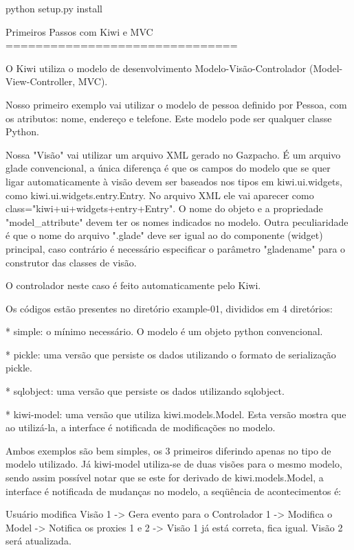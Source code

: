    python setup.py install



Primeiros Passos com Kiwi e MVC
===============================

O Kiwi utiliza o modelo de desenvolvimento
Modelo-Visão-Controlador (Model-View-Controller, MVC).

Nosso primeiro exemplo vai utilizar o modelo de pessoa definido por
Pessoa, com os atributos: nome, endereço e telefone. Este modelo pode
ser qualquer classe Python.

Nossa "Visão" vai utilizar um arquivo XML gerado no Gazpacho. É um
arquivo glade convencional, a única diferença é que os campos do
modelo que se quer ligar automaticamente à visão devem ser baseados nos
tipos em kiwi.ui.widgets, como kiwi.ui.widgets.entry.Entry. No arquivo
XML ele vai aparecer como  class="kiwi+ui+widgets+entry+Entry". O nome
do objeto e a propriedade "model_attribute" devem ter os nomes
indicados no modelo. Outra peculiaridade é que o nome do arquivo
".glade" deve ser igual ao do componente (widget) principal, caso
contrário é necessário especificar o parâmetro "gladename" para o
construtor das classes de visão.

O controlador neste caso é feito automaticamente pelo Kiwi.

Os códigos estão presentes no diretório example-01, divididos em 4
diretórios:

 * simple: o mínimo necessário. O modelo é um objeto python
   convencional.

 * pickle: uma versão que persiste os dados utilizando o formato de
   serialização pickle.

 * sqlobject: uma versão que persiste os dados utilizando sqlobject.

 * kiwi-model: uma versão que utiliza kiwi.models.Model. Esta versão
   mostra que ao utilizá-la, a interface é notificada de modificações
   no modelo.

Ambos exemplos são bem simples, os 3 primeiros diferindo apenas no
tipo de modelo utilizado. Já kiwi-model utiliza-se de duas visões
para o mesmo modelo, sendo assim possível notar que se este for
derivado de kiwi.models.Model, a interface é notificada de mudanças no
modelo, a seqüência de acontecimentos é:

   Usuário modifica Visão 1 ->
   Gera evento para o Controlador 1 ->
   Modifica o Model ->
   Notifica os proxies 1 e 2 ->
   Visão 1 já está correta, fica igual. Visão 2 será atualizada.

